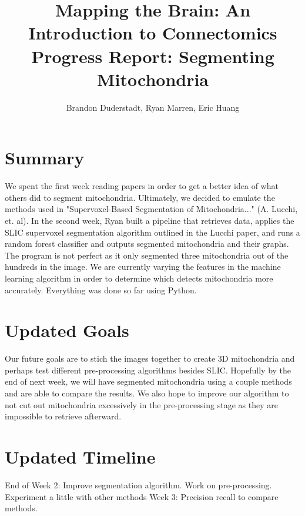 \documentclass[11pt]{article} %
\title{Mapping the Brain: An Introduction to Connectomics\\Progress Report: Segmenting Mitochondria}
\author{Brandon Duderstadt, Ryan Marren, Eric Huang}
\begin{document}
\maketitle

\section{Summary}

We spent the first week reading papers in order to get a better idea of what others did to segment mitochondria. Ultimately, we decided to emulate the methods used in "Supervoxel-Based Segmentation of Mitochondria..." (A. Lucchi, et. al). In the second week, Ryan built a pipeline that retrieves data, applies the SLIC supervoxel segmentation algorithm outlined in the Lucchi paper, and runs a random forest classifier and outputs segmented mitochondria and their graphs. The program is not perfect as it only segmented three mitochondria out of the hundreds in the image. We are currently varying the features in the machine learning algorithm in order to determine which detects mitochondria more accurately. Everything was done so far using Python.

\section{Updated Goals}
Our future goals are to stich the images together to create 3D mitochondria and perhaps test different pre-processing algorithms besides SLIC. Hopefully by the end of next week, we will have segmented mitochondria using a couple methods and are able to compare the results. We also hope to improve our algorithm to not cut out mitochondria excessively in the pre-processing stage as they are impossible to retrieve afterward.

\section{Updated Timeline}
End of Week 2: Improve segmentation algorithm. Work on pre-processing. Experiment a little with other methods
\newline
\newline
Week 3: Precision recall to compare methods.

{}

\end{document}
